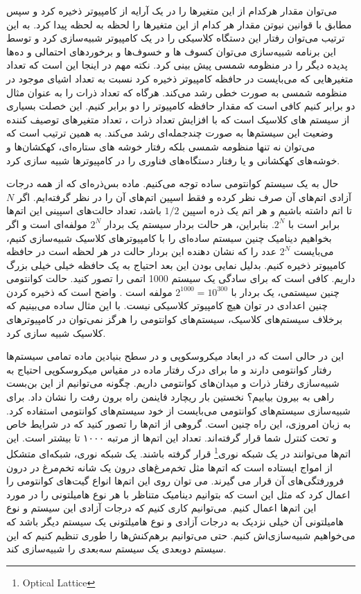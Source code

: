  می‌توان مقدار هرکدام از این متغیرها را در یک آرایه از کامپیوتر ذخیره کرد و سپس مطابق با قوانین نیوتن مقدار هر کدام از این متغیرها را لحظه به
لحظه پیدا کرد. به این ترتیب می‌توان رفتار این دستگاه کلاسیکی را در یک کامپیوتر شبیه‌سازی کرد و توسط این برنامه شبیه‌سازی می‌توان کسوف
ها و خسوف‌ها و برخوردهای احتمالی و ده‌ها پدیده دیگر را در منظومه شمسی پیش بینی کرد. نکته مهم در اینجا این است که تعداد متغیرهایی
که می‌بایست در حافظه کامپیوتر ذخیره کرد نسبت به تعداد اشیای موجود در منظومه شمسی به صورت خطی رشد می‌کند. هرگاه که تعداد ذرات را
به عنوان مثال دو برابر کنیم کافی است که مقدار حافظه کامپیوتر را دو برابر کنیم. این خصلت بسیاری از سیستم های کلاسیک است که با افزایش
تعداد ذرات ، تعداد متغیرهای توصیف کننده وضعیت این سیستم‌ها به صورت چندجمله‌ای رشد می‌کند. به همین ترتیب است که می‌توان نه تنها منظومه شمسی بلکه رفتار خوشه های ستاره‌ای، کهکشان‌ها و خوشه‌های کهکشانی و یا رفتار دستگاه‌های فناوری را در کامپیوترها شبیه سازی کرد. 


حال به یک سیستم کوانتومی ساده توجه می‌کنیم. ماده بس‌ذره‌ای که از همه درجات آزادی اتم‌های آن صرف نظر کرده و فقط اسپین اتم‌های آن را در نظر گرفته‌ایم. اگر $N$ تا اتم داشته باشیم و هر اتم یک ذره اسپین $1/2$ باشد، تعداد حالت‌های اسپینی این اتم‌ها برابر است با $2^{N}$.
 بنابراین، هر حالت بردار سیستم یک بردار $2^{N}$ مولفه‌ای است و اگر بخواهیم دینامیک چنین سیستم ساده‌ای را با کامپیوترهای کلاسیک شبیه‌سازی کنیم، می‌بایست $2^{N}$  عدد را که نشان دهنده این بردار حالت در هر لحظه است در حافظه کامپیوتر ذخیره کنیم. بدلیل نمایی بودن این بعد احتیاج به یک حافظه خیلی خیلی بزرگ داریم. کافی است که برای سادگی یک سیستم 1000 اتمی را تصور کنید. حالت کوانتومی چنین سیستمی، یک بردار با $2^{1000} = 10^{300}$ مولفه است . واضح است که ذخیره کردن چنین اعدادی در توان هیچ کامپیوتر کلاسیکی نیست.
 با این مثال ساده می‌بینیم که برخلاف سیستم‌های کلاسیک، سیستم‌های کوانتومی را هرگز نمی‌توان در کامپیوترهای کلاسیک شبیه سازی کرد.
 
این در حالی است که در ابعاد میکروسکوپی و در سطح بنیادین ماده تمامی سیستم‌ها رفتار کوانتومی دارند و ما برای درک رفتار ماده در مقیاس میکروسکوپی احتیاج به شبیه‌سازی رفتار ذرات و میدان‌های کوانتومی داریم. چگونه می‌توانیم از این بن‌بست راهی به بیرون بیابیم؟
نخستین بار ریچارد فاینمن راه برون رفت را نشان داد. برای شبیه‌سازی سیستم‌های کوانتومی می‌بایست از خود سیستم‌های کوانتومی استفاده کرد. به
زبان امروزی، این راه چنین است. گروهی از اتم‌ها را تصور کنید که در شرایط خاص و تحت کنترل شما قرار گرفته‌اند. تعداد این اتم‌ها از مرتبه
١٠٠٠ تا بیشتر است. این اتم‌ها می‌توانند در یک شبکه نوری\footnote{Optical Lattice} قرار گرفته باشند. یک شبکه نوری، شبکه‌ای متشکل از امواج ایستاده
است که اتم‌ها مثل تخم‌مرغ‌های درون یک شانه تخم‌مرغ در درون فرورفتگی‌های آن قرار می گیرند. می توان روی این اتم‌ها انواع گیت‌های
کوانتومی را اعمال کرد که مثل این است که بتوانیم دینامیک متناظر با هر نوع هامیلتونی را در مورد این اتم‌ها اعمال کنیم. می‌توانیم کاری کنیم که
درجات آزادی این سیستم و نوع هامیلتونی آن خیلی نزدیک به درجات آزادی و نوع هامیلتونی یک سیستم دیگر باشد که می‌خواهیم شبیه‌سازی‌اش کنیم. حتی می‌توانیم برهم‌کنش‌ها را طوری تنظیم کنیم که این سیستم دوبعدی یک سیستم سه‌بعدی را شبیه‌سازی کند.

